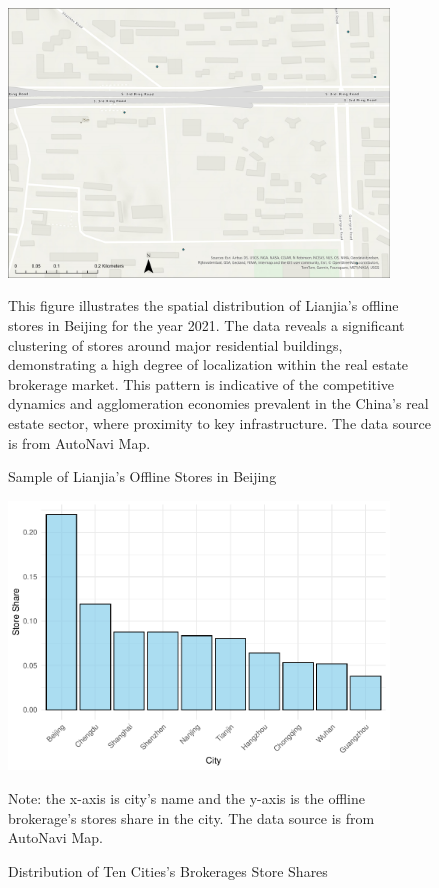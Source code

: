 \documentclass[11pt]{article}
\begin{document}
\begin{figure}[H]
  \centering
  \includegraphics[width=0.9\textwidth]{../figures/typical_layout_beijing.pdf}
  \caption{Sample of Lianjia's Offline Stores in Beijing}
  \label{fig:typical_layout_Beijing}
  
This figure illustrates the spatial distribution of Lianjia's offline stores in Beijing for the year 2021. The data reveals a significant clustering of stores around major residential buildings, demonstrating a high degree of localization within the real estate brokerage market. This pattern is indicative of the competitive dynamics and agglomeration economies prevalent in the China's real estate sector, where proximity to key infrastructure. The data source is from AutoNavi Map.
\end{figure}

\clearpage



\clearpage

\begin{figure}[H]
  \centering
  \includegraphics[width=0.9\textwidth]{../figures/distribution_of_ten_cities.pdf}
  \caption{Distribution of Ten Cities's Brokerages Store Shares}
  \label{fig:distribution_store_shares}

  Note: the x-axis is city's name and the y-axis is the offline brokerage's stores share in the city. The data source is from AutoNavi Map.
\end{figure}
\end{document}
